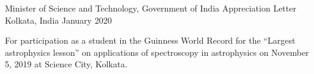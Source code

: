 
\begin{cventries}

    \cventry
      {Minister of Science and Technology, Government of India} %
      {Appreciation Letter} %
      {Kolkata, India} %
      {January 2020} %
      {
        \begin{cvitems} %
          \item{For participation as a student in the Guinness World Record for the ``Largest astrophysics lesson'' on applications of spectroscopy in astrophysics on November 5, 2019 at Science City, Kolkata.}
        \end{cvitems}
      }

  \end{cventries}
  

